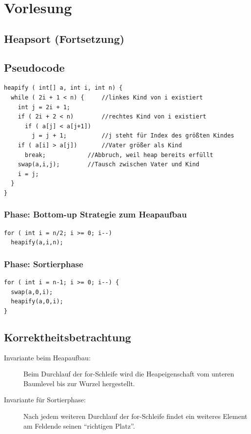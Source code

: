 \chapter{Vorlesung}
\section*{Heapsort (Fortsetzung)}

\section{Pseudocode}
\begin{lstlisting}[style = pseudo]
heapify ( int[] a, int i, int n) {
  while ( 2i + 1 < n) {		//linkes Kind von i existiert
    int j = 2i + 1;
    if ( 2i + 2 < n)  		//rechtes Kind von i existiert
      if ( a[j] < a[j+1])
        j = j + 1;  		//j steht für Index des größten Kindes
    if ( a[i] > a[j])  		//Vater größer als Kind
      break;  			//Abbruch, weil heap bereits erfüllt
    swap(a,i,j); 		//Tausch zwischen Vater und Kind
    i = j;
  }
}
\end{lstlisting}
\subsection{Phase: Bottom-up Strategie zum Heapaufbau}
\begin{lstlisting}[style = pseudo]
for ( int i = n/2; i >= 0; i--)
  heapify(a,i,n);
\end{lstlisting}
\subsection{Phase: Sortierphase}
\begin{lstlisting}[style = pseudo]
for ( int i = n-1; i >= 0; i--) {
  swap(a,0,i);
  heapify(a,0,i);
}
\end{lstlisting}
\section{Korrektheitsbetrachtung}
\begin{description}
	\item[Invariante beim Heapaufbau:] Beim Durchlauf der for-Schleife wird die Heapeigenschaft vom unteren Baumlevel bis zur Wurzel hergestellt.
	\item[Invariante für Sortierphase:] Nach jedem weiteren Durchlauf der for-Schleife findet ein weiteres Element am Feldende seinen "`richtigen Platz"'.
\end{description}

